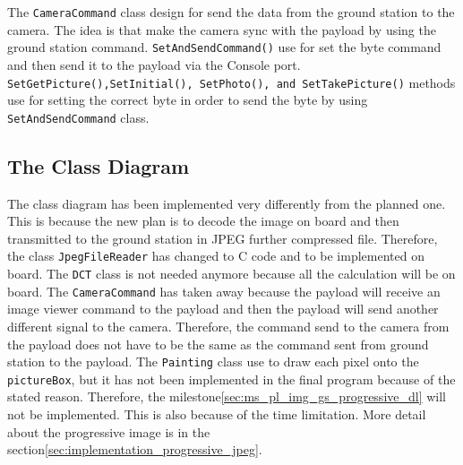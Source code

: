 The \texttt{CameraCommand} class design for send the data from the ground station to the camera. The idea is that make the camera sync with the payload by using the ground station command. \texttt{SetAndSendCommand()} use for set the byte command and then send it to the payload via the Console port. \texttt{SetGetPicture(),SetInitial(), SetPhoto(), and SetTakePicture()} methods use for setting the correct byte in order to send the byte by using \texttt{SetAndSendCommand} class.

\subsection*{The Class Diagram}
The class diagram has been implemented very differently from the planned one.
This is because the new plan is to decode the image on board and then transmitted to the ground station in JPEG further compressed file. 
Therefore, the class \texttt{JpegFileReader} has changed to C code and to be implemented on board. 
The \texttt{DCT} class is not needed anymore because all the calculation will be on board. 
The \texttt{CameraCommand} has taken away because the payload will receive an image viewer command to the payload and then the payload will send another different signal to the camera.
Therefore, the command send to the camera from the payload does not have to be the same as the command sent from ground station to the payload. 
The \texttt{Painting} class use to draw each pixel onto the \texttt{pictureBox}, but it has not been implemented in the final program because of the stated reason.
Therefore, the milestone\ref{sec:ms_pl_img_gs_progressive_dl} will not be implemented.
This is also because of the time limitation.
More detail about the progressive image is in the section\ref{sec:implementation_progressive_jpeg}.
 
